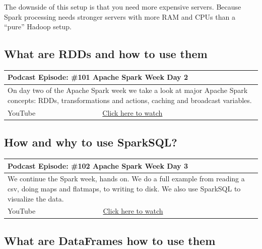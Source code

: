 \documentclass[12pt, numbers=noenddot]{scrreprt} %
\begin{document}
The downside of this setup is that you need more expensive servers. Because Spark processing needs stronger servers with more RAM and CPUs than a “pure” Hadoop setup.


\subsection{What are RDDs and how to use them}

\begin{table}[h]
\begin{tabular}{ll}
\hline
\multicolumn{2}{l}{\textbf{Podcast Episode:} \#101 Apache Spark Week Day 2} \\ \hline
\multicolumn{2}{p{15cm}}{On day two of the Apache Spark week we take a look at major Apache Spark concepts: RDDs, transformations and actions, caching and broadcast variables.}         \\ \hline
\multicolumn{1}{l|}{YouTube}   & \href{https://youtu.be/9I6mA2W6_HU}{Click here to watch}   \\ \hline
\end{tabular}
\end{table}

\subsection{How and why to use SparkSQL?}

\begin{table}[h]
\begin{tabular}{ll}
\hline
\multicolumn{2}{l}{\textbf{Podcast Episode:} \#102 Apache Spark Week Day 3} \\ \hline
\multicolumn{2}{p{15cm}}{We continue the Spark week, hands on. We do a full example from reading a csv, doing maps and flatmaps, to writing to disk. We also use SparkSQL to visualize the data.}         \\ \hline
\multicolumn{1}{l|}{YouTube}   & \href{https://youtu.be/Fk-s8eKD4ZI}{Click here to watch}   \\ \hline
\end{tabular}
\end{table}

\subsection{What are DataFrames how to use them}
\end{document}
